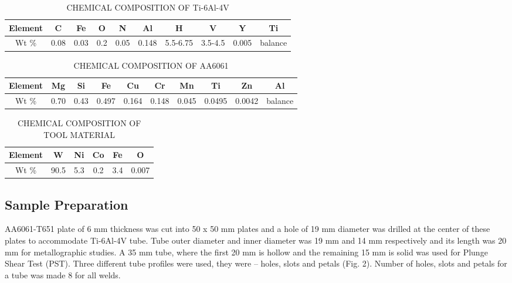 \documentclass[preprint]{elsarticle}
\begin{document}
\begin{table}[!htbp]
\caption{CHEMICAL COMPOSITION OF Ti-6Al-4V}
\centering
\begin{tabular}{|c|c|c|c|c|c|c|c|c|c|}
\hline 
Element & C & Fe & O & N & Al & H & V & Y & Ti\\ 
\hline 
Wt \% & 0.08 & 0.03 & 0.2 & 0.05 & 0.148 & 5.5-6.75 & 3.5-4.5 & 0.005 & balance\\ 
\hline 
\end{tabular}
\label{table:Ti-6Al-4V-composition} %
\end{table}


\begin{table*}[!htbp]
\caption{CHEMICAL COMPOSITION OF AA6061}
\centering
\begin{tabular}{|c|c|c|c|c|c|c|c|c|c|}
\hline 
Element & Mg & Si & Fe & Cu & Cr & Mn & Ti & Zn & Al\\ 
\hline 
Wt \% & 0.70 & 0.43 & 0.497 & 0.164 & 0.148 & 0.045 & 0.0495 & 0.0042 & balance\\ 
\hline 
\end{tabular}
\label{table:AA6061-composition} %
\end{table*}



\begin{table*}[!htbp]
\caption{CHEMICAL COMPOSITION OF TOOL MATERIAL}
\centering
\begin{tabular}{|c|c|c|c|c|c|}
\hline 
Element & W & Ni & Co & Fe & O \\ 
\hline 
Wt \% & 90.5 & 5.3 & 0.2 & 3.4 & 0.007 \\ 
\hline 
\end{tabular}
\label{table:tool-composition} %
\end{table*}

\subsection{Sample Preparation}
\label{subsec:Sample Preparation}
AA6061-T651 plate of 6 mm thickness was cut into 50 x 50 mm plates and a hole of 19 mm diameter was drilled at the center of these plates to accommodate Ti-6Al-4V tube. Tube outer diameter and inner diameter was 19 mm and 14 mm respectively and its length was 20 mm for metallographic studies. A 35 mm tube, where the first 20 mm is hollow and the remaining 15 mm is solid was used for Plunge Shear Test (PST). Three different tube profiles were used, they were – holes, slots and petals (Fig. 2). Number of holes, slots and petals for a tube was made 8 for all welds.
\end{document}
